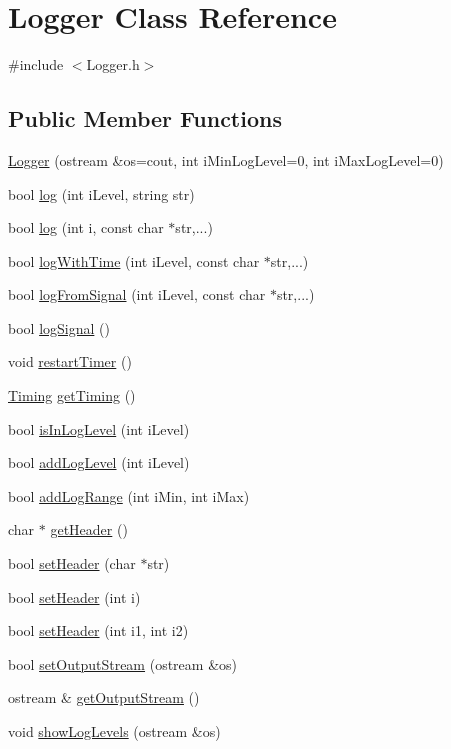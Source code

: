 \hypertarget{classLogger}{}\section{Logger Class Reference}
\label{classLogger}


{\ttfamily \#include $<$Logger.\+h$>$}

\subsection*{Public Member Functions}
\begin{DoxyCompactItemize}
\item 
\hyperlink{classLogger_a33b7bdcf959df509a21bed5cf08b883e}{Logger} (ostream \&os=cout, int i\+Min\+Log\+Level=0, int i\+Max\+Log\+Level=0)
\item 
bool \hyperlink{classLogger_a0e890cdb0bf31377aa3e85116af0cf21}{log} (int i\+Level, string str)
\item 
bool \hyperlink{classLogger_ac964811d4771940e703f3fdc2709b6f2}{log} (int i, const char $\ast$str,...)
\item 
bool \hyperlink{classLogger_a11c42c98063a97d8e6581eea16065fac}{log\+With\+Time} (int i\+Level, const char $\ast$str,...)
\item 
bool \hyperlink{classLogger_a78774d5c4edd7291fdabae25cddce26d}{log\+From\+Signal} (int i\+Level, const char $\ast$str,...)
\item 
bool \hyperlink{classLogger_a49df5f4796cc2c505006818990b1f6ff}{log\+Signal} ()
\item 
void \hyperlink{classLogger_a45a192393410702930d5d2d9a3d7f476}{restart\+Timer} ()
\item 
\hyperlink{classTiming}{Timing} \hyperlink{classLogger_ae7f0ec74f3a9f3c103ec631ec8aa5a4c}{get\+Timing} ()
\item 
bool \hyperlink{classLogger_a803d98204c8b5c6cb52e2e55a4ebb6c6}{is\+In\+Log\+Level} (int i\+Level)
\item 
bool \hyperlink{classLogger_ac5d71ec6685e79ca6bf451729861c709}{add\+Log\+Level} (int i\+Level)
\item 
bool \hyperlink{classLogger_ac05f2359d8c8a78a88b39e48f6265733}{add\+Log\+Range} (int i\+Min, int i\+Max)
\item 
char $\ast$ \hyperlink{classLogger_a2689491b6375e1a8fa48721ce24d1917}{get\+Header} ()
\item 
bool \hyperlink{classLogger_a74b2f2718ea82e6c7c8852eed19e50f0}{set\+Header} (char $\ast$str)
\item 
bool \hyperlink{classLogger_ace8b180dc65bd82e4b55b7cafba75c61}{set\+Header} (int i)
\item 
bool \hyperlink{classLogger_a1ef9493363ea4425d7a5cbbfae8bc387}{set\+Header} (int i1, int i2)
\item 
bool \hyperlink{classLogger_aa4a51ea56d6093185019817a7d43825c}{set\+Output\+Stream} (ostream \&os)
\item 
ostream \& \hyperlink{classLogger_aad722d5f5b93707f25ddd92892ba2325}{get\+Output\+Stream} ()
\item 
void \hyperlink{classLogger_af4a4e7c25732d1ac6f9cb072191e6e9b}{show\+Log\+Levels} (ostream \&os)
\end{DoxyCompactItemize}


